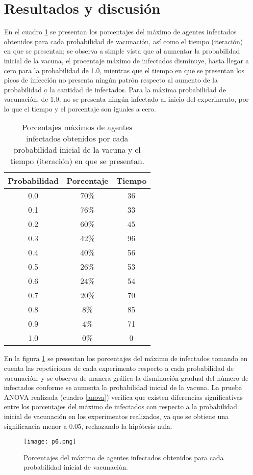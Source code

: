 \documentclass{article}
\begin{document}
\section{Resultados y discusión}
En el cuadro \ref{tabla} se presentan los porcentajes del máximo de agentes infectados obtenidos para cada probabilidad de vacunación, así como el tiempo (iteración) en que se presentan; se observa a simple vista que al aumentar la probabilidad inicial de la vacuna, el procentaje máximo de infectados disminuye, hasta llegar a cero para la probabilidad de 1.0, mientras que el tiempo en que se presentan los picos de infección no presenta ningún patrón respecto al aumento de la probabilidad o la cantidad de infectados. Para la máxima probabilidad de vacunación, de 1.0, no se presenta ningún infectado al inicio del experimento, por lo que el tiempo y el porcentaje son iguales a cero.
\begin{table}[h]
\begin{center}
\caption{Porcentajes máximos de agentes infectados obtenidos por cada probabilidad inicial de la vacuna y el tiempo (iteración) en que se presentan.}
\label{tabla}
\begin{tabular}{c c c}
\hline
\textbf{Probabilidad}&\textbf{Porcentaje}&\textbf{Tiempo}\\
\hline
0.0&70\%&36 \\
0.1&76\%&33\\
0.2&60\%&45\\
0.3&42\%&96\\
0.4&40\%&56\\
0.5&26\%&53\\
0.6&24\%&54\\
0.7&20\%&70\\
0.8&8\%&85\\
0.9&4\%&71\\
1.0&0\%&0\\
\hline
\end{tabular}
\end{center}
\end{table}

En la figura \ref{probs} se presentan los porcentajes del máximo de infectados tomando en cuenta las repeticiones de cada experimento respecto a cada probabilidad de vacunación, y se observa de manera gráfica la disminución gradual del número de infectados conforme se aumenta la probabilidad inicial de la vacuna. La prueba ANOVA realizada (cuadro \ref{anova}) verifica que existen diferencias significativas entre los porcentajes del máximo de infectados con respecto a la probabilidad inicial de vacunación en los experimentos realizados, ya que se obtiene una significancia menor a 0.05, rechazando la hipótesis nula.
\begin{figure}[ptb]
\begin{center}
\texttt{[image: p6.png]}
\end{center}
\caption{Porcentajes del máximo de agentes infectados obtenidos para cada probabilidad inicial de vacunación.\label{probs}}
\end{figure}
\end{document}

